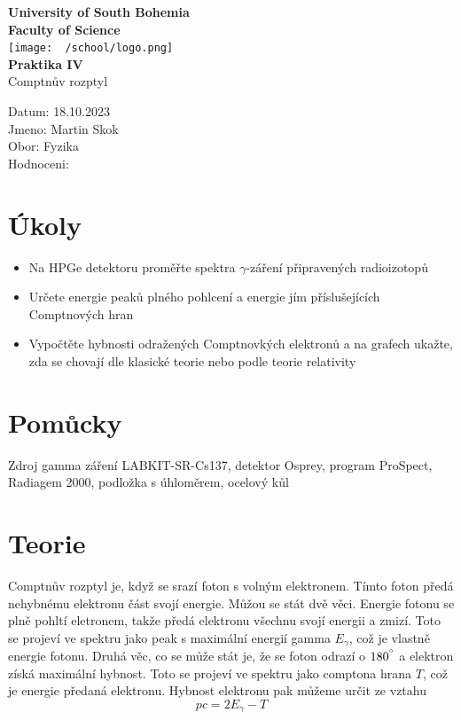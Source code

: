 \documentclass{article}
\begin{document}
\begin{center}
\textbf{\Huge{University of South Bohemia}}\\
\vspace{50px}
\textbf{\Large{Faculty of Science}} \\
\vspace{30px}
\texttt{[image: ~/school/logo.png]} \\
\vspace{30px}
\textbf{\large{Praktika IV}}
\vspace{20px}
\\
\vspace{20px}
\large{Comptnův rozptyl} \\
\vspace{60px}
\end{center}
\begin{flushleft}
Datum: 18.10.2023 \\
Jmeno: Martin Skok \\
Obor: Fyzika \\
Hodnoceni:
\end{flushleft}
\newpage
\section{Úkoly}
\begin{itemize}
  \item Na HPGe detektoru proměřte spektra $\gamma$-záření připravených radioizotopů
  \item Určete energie peaků plného pohlcení a energie jím příslušejících Comptnových hran
  \item Vypočtěte hybnosti odražených Comptnovkých elektronů a na grafech ukažte,
        zda se chovají dle klasické teorie nebo podle teorie relativity
\end{itemize}
\section{Pomůcky}
Zdroj gamma záření LABKIT-SR-Cs137, detektor Osprey, program ProSpect, Radiagem
2000, podložka s úhloměrem, ocelový kůl
\section{Teorie}
Comptnův rozptyl je, když se srazí foton s volným elektronem. Tímto foton předá nehybnému elektronu část svojí energie. Můžou se stát dvě věci. Energie fotonu se plně pohltí eletronem, takže předá elektronu všechnu svojí energii a zmizí. Toto se projeví ve spektru jako peak s maximální energií gamma $E_{\gamma}$, což je vlastně energie fotonu.
Druhá věc, co se může stát je, že se foton odrazí o $180^{\degree}$ a elektron získá maximální hybnost. Toto se projeví ve spektru jako comptona hrana $T$, což je energie předaná elektronu.
Hybnost elektronu pak můžeme určit ze vztahu
\begin{equation}\label{eq:hyb}
  pc = 2E_{\gamma} - T
\end{equation}
\begin{equation}
\end{equation}
\begin{equation}
\end{equation}
\end{document}

